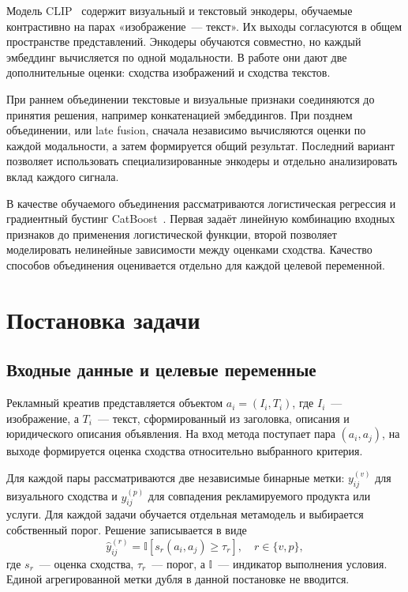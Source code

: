 \documentclass{misisarticle}
\begin{document}
Модель CLIP~\cite{clip} содержит визуальный и текстовый энкодеры, обучаемые контрастивно на парах «изображение~--- текст». Их выходы согласуются в общем пространстве представлений. Энкодеры обучаются совместно, но каждый эмбеддинг вычисляется по одной модальности. В работе они дают две дополнительные оценки: сходства изображений и сходства текстов.

При раннем объединении текстовые и визуальные признаки соединяются до принятия решения, например конкатенацией эмбеддингов. При позднем объединении, или late fusion, сначала независимо вычисляются оценки по каждой модальности, а затем формируется общий результат. Последний вариант позволяет использовать специализированные энкодеры и отдельно анализировать вклад каждого сигнала.

В качестве обучаемого объединения рассматриваются логистическая регрессия и градиентный бустинг CatBoost~\cite{catboost}. Первая задаёт линейную комбинацию входных признаков до применения логистической функции, второй позволяет моделировать нелинейные зависимости между оценками сходства. Качество способов объединения оценивается отдельно для каждой целевой переменной.

\section{Постановка задачи}

\subsection{Входные данные и целевые переменные}

Рекламный креатив представляется объектом $a_i=(I_i,T_i)$, где $I_i$~--- изображение, а $T_i$~--- текст, сформированный из заголовка, описания и юридического описания объявления. На вход метода поступает пара $(a_i,a_j)$, на выходе формируется оценка сходства относительно выбранного критерия.

Для каждой пары рассматриваются две независимые бинарные метки: $y_{ij}^{(v)}$ для визуального сходства и $y_{ij}^{(p)}$ для совпадения рекламируемого продукта или услуги. Для каждой задачи обучается отдельная метамодель и выбирается собственный порог. Решение записывается в виде
\begin{equation}
  \widehat y_{ij}^{(r)} =
  \mathbb{I}\!\left[s_r(a_i,a_j)\geq\tau_r\right],
  \quad r\in\{v,p\},
  \label{eq:decision}
\end{equation}
где $s_r$~--- оценка сходства, $\tau_r$~--- порог, а $\mathbb{I}$~--- индикатор выполнения условия. Единой агрегированной метки дубля в данной постановке не вводится.
\end{document}
